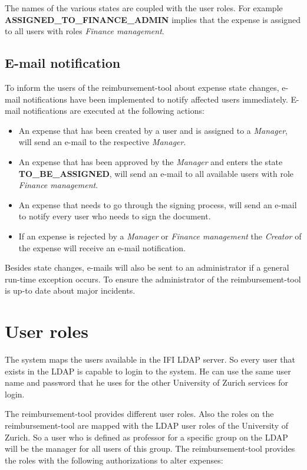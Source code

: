 The names of the various states are coupled with the user roles. For example \textbf{ASSIGNED\_TO\_FINANCE\_ADMIN} implies that the expense is assigned to all users with roles \textit{Finance management}.

\subsection{E-mail notification}
To inform the users of the reimbursement-tool about expense state changes, e-mail notifications have been implemented to notify affected users immediately. E-mail notifications are executed at the following actions:
\begin{itemize}
    \item An expense that has been created by a user and is assigned to a \textit{Manager}, will send an e-mail to the respective \textit{Manager}.
    \item An expense that has been approved by the \textit{Manager} and enters the state \newline \textbf{TO\_BE\_ASSIGNED}, will send an e-mail to all available users with role \textit{Finance management}.
    \item An expense that needs to go through the signing process, will send an e-mail to notify every user who needs to sign the document.
    \item If an expense is rejected by a \textit{Manager} or \textit{Finance management} the \textit{Creator} of the expense will receive an e-mail notification.
\end{itemize}

Besides state changes, e-mails will also be sent to an administrator if a general run-time exception occurs. To ensure the administrator of the reimbursement-tool is up-to date about major incidents.


\section{User roles}
\label{user-roles}

The system maps the users available in the IFI LDAP server. So every user that exists in the LDAP is capable to login to the system. He can use the same user name and password that he uses for the other University of Zurich services for login. \par

The reimbursement-tool provides different user roles. Also the roles on the reimbursement-tool are mapped with the LDAP user roles of the University of Zurich. So a user who is defined as professor for a specific group on the LDAP will be the manager for all users of this group. The reimbursement-tool provides the roles with the following authorizations to alter expenses:

